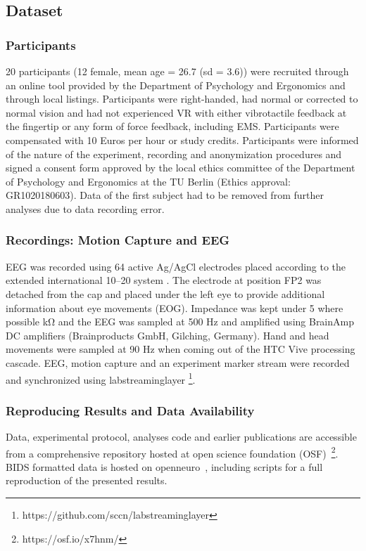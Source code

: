 
\subsection{Dataset}

\subsubsection{Participants}
20 participants (12 female, mean age = 26.7 (sd = 3.6)) were recruited through an online tool provided by the Department of Psychology and Ergonomics and through local listings. Participants were right-handed, had normal or corrected to normal vision and had not experienced VR with either vibrotactile feedback at the fingertip or any form of force feedback, including EMS. Participants were compensated with 10 Euros per hour or study credits. Participants were informed of the nature of the experiment, recording and anonymization procedures and signed a consent form approved by the local ethics committee of the Department of Psychology and Ergonomics at the TU Berlin (Ethics approval: GR1020180603). Data of the first subject had to be removed from further analyses due to data recording error.

\subsubsection{Recordings: Motion Capture and EEG}
EEG was recorded using 64 active Ag/AgCl electrodes placed according to the extended international 10–20 system \cite{Chatrian1985-ys}. The electrode at position FP2 was detached from the cap and placed under the left eye to provide additional information about eye movements (EOG). Impedance was kept under 5 where possible \si{\kohm} and the EEG was sampled at 500 Hz and amplified using BrainAmp DC amplifiers (Brainproducts GmbH, Gilching, Germany). Hand and head movements were sampled at 90 Hz when coming out of the HTC Vive processing cascade. EEG, motion capture and an experiment marker stream were recorded and synchronized using labstreaminglayer \footnote{https://github.com/sccn/labstreaminglayer}.

\subsubsection{Reproducing Results and Data Availability}
Data, experimental protocol, analyses code and earlier publications are accessible from a comprehensive repository hosted at open science foundation (OSF)~\footnote{https://osf.io/x7hnm/}. BIDS formatted data is hosted on openneuro~\cite{ds003552:1.1.0}, including scripts for a full reproduction of the presented results.

